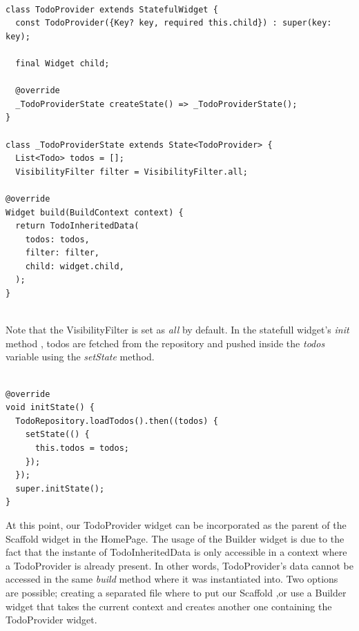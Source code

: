 \begin{code}
 \mbox{}

\label{code:2.19}
\begin{verbatim}

class TodoProvider extends StatefulWidget {
  const TodoProvider({Key? key, required this.child}) : super(key: key);

  final Widget child;

  @override
  _TodoProviderState createState() => _TodoProviderState();
}

class _TodoProviderState extends State<TodoProvider> {
  List<Todo> todos = [];
  VisibilityFilter filter = VisibilityFilter.all;

@override
Widget build(BuildContext context) {
  return TodoInheritedData(
    todos: todos,
    filter: filter,
    child: widget.child,
  );
}
\end{verbatim}
\end{code}
\mbox{}\\
Note that the VisibilityFilter is set as \textit{all} by default.
In the statefull widget's \textit{init} method , todos are fetched from the repository and pushed inside the \textit{todos} variable using the \textit{setState} method.
\mbox{}\\
\begin{code}
 \mbox{}

\label{code:2.20}
\begin{verbatim}

@override
void initState() {
  TodoRepository.loadTodos().then((todos) {
    setState(() {
      this.todos = todos;
    });
  });
  super.initState();
}
\end{verbatim}
\end{code}
At this point, our TodoProvider widget can be incorporated as the parent of the Scaffold widget in the HomePage. The usage of the Builder widget is due to the fact that the instante of TodoInheritedData is only accessible in a context where a TodoProvider is already present. In other words, TodoProvider’s data cannot be accessed in the same \textit{build } method where it was instantiated into. Two options are possible; creating a separated file where to put our Scaffold ,or use a Builder widget that takes the current context and creates another one containing the TodoProvider widget.
